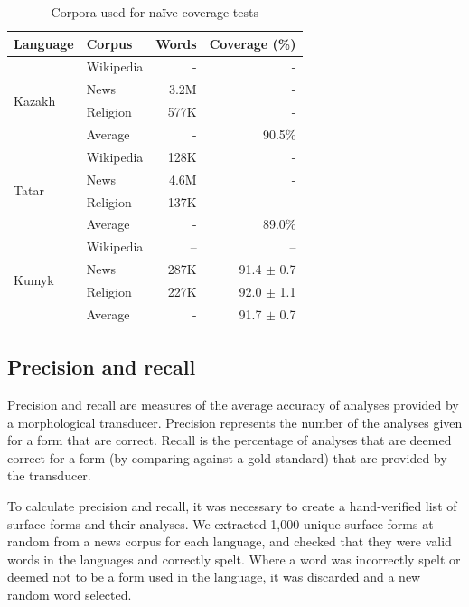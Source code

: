 \documentclass[a4paper,11pt,twocolumn]{article}
\begin{document}
\begin{table}
\begin{center}
\begin{tabular}{llrr}
\toprule
\textbf{Language} & \textbf{Corpus} & \textbf{Words} & \textbf{Coverage} (\%) \\
\midrule
\multirow{4}{*}{Kazakh} & Wikipedia &  -  &  - \\
	& News & 3.2M & - \\
	& Religion & 577K & - \\\cline{2-4}
	& Average & - & 90.5\% \\
\midrule
\multirow{4}{*}{Tatar} & Wikipedia & 128K &  - \\
	& News & 4.6M & - \\
	& Religion & 137K & - \\\cline{2-4}
	& Average & - & 89.0\% \\
\midrule
\multirow{4}{*}{Kumyk} & Wikipedia & -- & -- \\
        & News & 287K &  91.4 $\pm$ 0.7 \\
	& Religion & 227K & 92.0 $\pm$ 1.1 \\\cline{2-4}
	& Average & - & 91.7 $\pm$ 0.7 \\
\bottomrule
\end{tabular}
 \caption{Corpora used for naïve coverage tests}
 \label{table:corpora}
\end{center}
\end{table}

\subsection{Precision and recall}

Precision and recall are measures of the average accuracy of analyses provided by a morphological transducer.  Precision represents the number of the analyses given for a form that are correct.  Recall is the percentage of analyses that are deemed correct for a form (by comparing against a gold standard) that are provided by the transducer.

To calculate precision and recall, it was necessary to create a hand-verified list of surface forms and their analyses.  We extracted 1,000 unique surface forms at random from a news corpus for each language, and checked that they were valid words in the languages and correctly spelt.  Where a word was incorrectly spelt or deemed not to be a form used in the language, it was discarded and a new random word selected.
\end{document}
